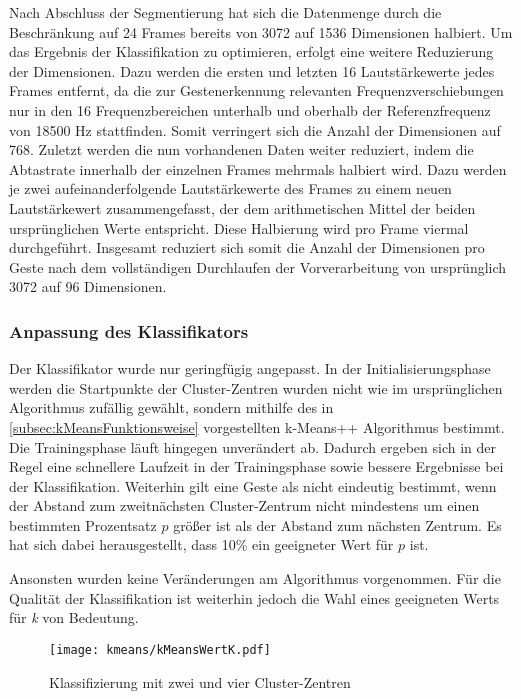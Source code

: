Nach Abschluss der Segmentierung hat sich die Datenmenge durch die Beschränkung auf 24 Frames bereits von 3072 auf 1536 Dimensionen halbiert. Um das Ergebnis der Klassifikation zu optimieren, erfolgt eine weitere Reduzierung der Dimensionen. Dazu werden die ersten und letzten 16 Lautstärkewerte jedes Frames entfernt, da die zur Gestenerkennung relevanten Frequenzverschiebungen nur in den 16 Frequenzbereichen unterhalb und oberhalb der Referenzfrequenz von 18500 Hz stattfinden. Somit verringert sich die Anzahl der Dimensionen auf 768. Zuletzt werden die nun vorhandenen Daten weiter reduziert, indem die Abtastrate innerhalb der einzelnen Frames mehrmals halbiert wird. Dazu werden je zwei aufeinanderfolgende Lautstärkewerte des Frames zu einem neuen Lautstärkewert zusammengefasst, der dem arithmetischen Mittel der beiden ursprünglichen Werte entspricht. Diese Halbierung wird pro Frame viermal durchgeführt.
Insgesamt reduziert sich somit die Anzahl der Dimensionen pro Geste nach dem vollständigen Durchlaufen der Vorverarbeitung von ursprünglich 3072 auf 96 Dimensionen. 





\subsubsection{Anpassung des Klassifikators}
Der Klassifikator wurde nur geringfügig angepasst.
In der Initialisierungsphase werden die Startpunkte der Cluster-Zentren wurden nicht wie im ursprünglichen Algorithmus zufällig gewählt, sondern mithilfe des in \autoref{subsec:kMeansFunktionsweise} vorgestellten k-Means++ Algorithmus bestimmt. Die Trainingsphase läuft hingegen unverändert ab.
Dadurch ergeben sich in der Regel eine schnellere Laufzeit in der Trainingsphase sowie bessere Ergebnisse bei der Klassifikation.
Weiterhin gilt eine Geste als nicht eindeutig bestimmt, wenn der Abstand zum zweitnächsten Cluster-Zentrum nicht mindestens um einen bestimmten Prozentsatz $p$ größer ist als der Abstand zum nächsten Zentrum. Es hat sich dabei herausgestellt, dass 10\% ein geeigneter Wert für $p$ ist. %

Ansonsten wurden keine Veränderungen am Algorithmus vorgenommen.
Für die Qualität der Klassifikation ist weiterhin jedoch die Wahl eines geeigneten Werts für \emph{k} von Bedeutung.

\begin{figure*}[htbp]
    \centering
   \texttt{[image: kmeans/kMeansWertK.pdf]}
\caption{Klassifizierung mit zwei und vier Cluster-Zentren}
\label{fig:kMeansWertK}
\end{figure*}


